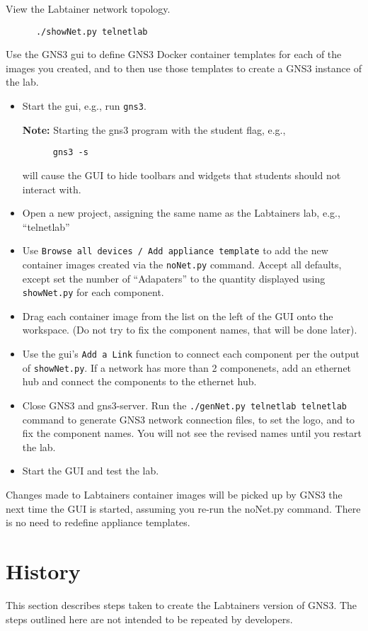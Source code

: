 \documentclass[12pt]{article}
\begin{document}
View the Labtainer network topology.
\begin{verbatim}
      ./showNet.py telnetlab
\end{verbatim}
\noindent Use the GNS3 gui to define GNS3 Docker container templates for each of the 
images you created, and to then use those templates to create a GNS3 instance of 
the lab.
\begin{itemize}
	\item Start the gui, e.g., run {\tt gns3}.  
	
	{\bf Note:} Starting the gns3 program with the \-\-student flag, e.g., 
	\begin{verbatim}	
	  gns3 -s 
	\end{verbatim}		
	will cause the GUI to hide toolbars and widgets that students should not interact with.
	\item Open a new project, assigning the same name as the Labtainers lab, e.g., ``telnetlab''
	\item Use {\tt Browse all devices / Add appliance template} to add the new container images created
		via the {\tt noNet.py} command.  Accept all defaults, except set the number of ``Adapaters'' to
		the quantity displayed using {\tt showNet.py} for each component.
	\item Drag each container image from the list on the left of the GUI onto the workspace.  (Do not try to fix
		the component names, that will be done later).
	\item Use the gui's {\tt Add a Link} function to connect each component per the output of {\tt showNet.py}. If a network has more than 2 componenets, add an ethernet hub and connect the components to the ethernet hub.
	\item Close GNS3 and gns3-server. Run the {\tt ./genNet.py telnetlab telnetlab} command to generate GNS3 network connection files, to set the logo, and to
		fix the component names.  You will not see the revised names until you restart the lab.
	\item Start the GUI and test the lab.
\end{itemize}
Changes made to Labtainers container images will be picked up by GNS3 the next time the GUI is started,
assuming you re-run the noNet.py command.  There is no need to redefine appliance templates.

\section{History}
This section describes steps taken to create the Labtainers version of GNS3.
The steps outlined here are not intended to be repeated by developers.
\end{document}
